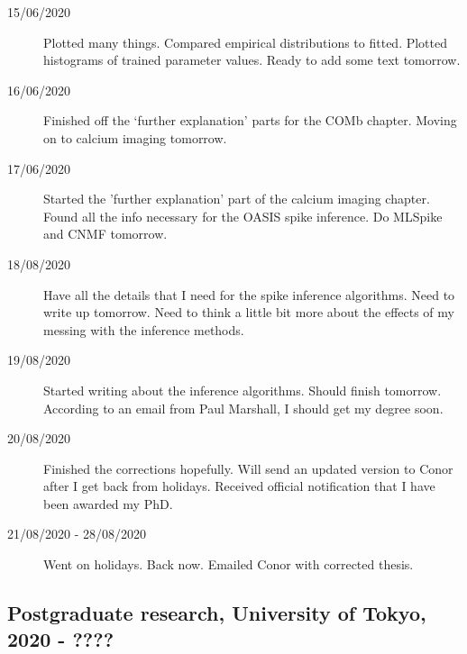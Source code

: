 \documentclass[a4paper,12pt]{article}
\theoremstyle{definition}
\begin{document}
\begin{description}
  \item[15/06/2020] Plotted many things. Compared empirical distributions to fitted. Plotted histograms of trained parameter values. Ready to add some text tomorrow.

	\item[16/06/2020] Finished off the `further explanation' parts for the COMb chapter. Moving on to calcium imaging tomorrow.

	\item[17/06/2020] Started the 'further explanation' part of the calcium imaging chapter. Found all the info necessary for the OASIS spike inference. Do MLSpike and CNMF tomorrow.

  \item[18/08/2020] Have all the details that I need for the spike inference algorithms. Need to write up tomorrow. Need to think a little bit more about the effects of my messing with the inference methods.

	\item[19/08/2020] Started writing about the inference algorithms. Should finish tomorrow. According to an email from Paul Marshall, I should get my degree soon.

	\item[20/08/2020] Finished the corrections hopefully. Will send an updated version to Conor after I get back from holidays. Received official notification that I have been awarded my PhD.

	\item[21/08/2020 - 28/08/2020] Went on holidays. Back now. Emailed Conor with corrected thesis.

\end{description}

\newpage

\subsection*{Postgraduate research, University of Tokyo, 2020 - ????}
\end{document}
